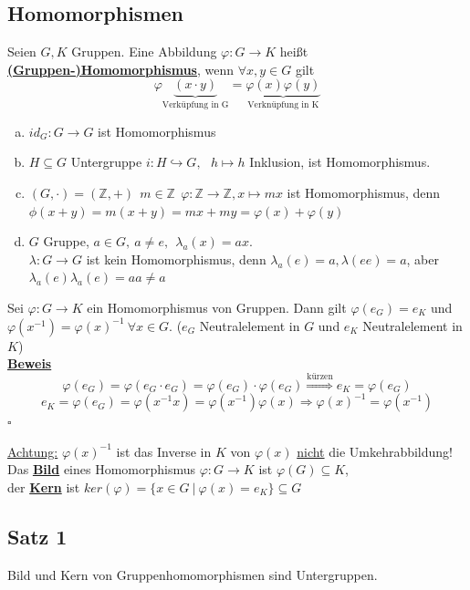 \documentclass[a4paper, pagesize=pdftex, pdftex, twoside, headsepline, index=totoc,toc=listof, fontsize=10pt, cleardoublepage=empty, headinclude, DIV=13, BCOR=13mm]{scrartcl}
\newcommand{\bet}[1]{\uline{\textbf{#1}}} %
\newcommand{\Index}[1]{\uline{\textbf{#1}}\index{#1}} %
\begin{document}
\subsection{Homomorphismen}
\label{sub:homomorphismen}
Seien $G,K$ Gruppen. Eine Abbildung $\varphi: G \to K$ heißt \bet{(Gruppen-)Homomorphismus}, wenn $\forall x,y \in G$ gilt
\[\varphi\underbrace{(x\cdot y)}_{\text{Verküpfung in G} } =\underbrace{\varphi(x)\varphi(y)}_{\text{Verknüpfung in K}} \]

\begin{enumerate}[(a)]
	\item $id_G: G \to G$ ist Homomorphismus
	\item $H \subseteq G$ Untergruppe   $i:H \hookrightarrow G,~~~h \mapsto h$ Inklusion, ist Homomorphismus.
	\item $(G,\cdot)=(\mathds{Z},+)~~m\in \mathds{Z} ~~ \varphi:\mathds{Z} \to \mathds{Z}, x\mapsto mx$ ist Homomorphismus, denn $\phi(x+y)=m(x+y)=mx+my=\varphi(x)+\varphi(y)$
	\item $G$ Gruppe, $a \in G,~ a\not= e,~~ \lambda_a(x)=ax$.\\
	$\lambda: G \to G$ ist kein Homomorphismus, denn $\lambda_a(e)=a, \lambda(ee)=a$, aber $\lambda_a(e)\lambda_a(e)=aa\not=a$
\end{enumerate}

Sei $\varphi:G \to K$ ein Homomorphismus von Gruppen. Dann gilt $\varphi(e_G)=e_K$ und $\varphi(x^{-1})=\varphi(x)^{-1}~\forall x \in G$. ($e_G$ Neutralelement in $G$ und $e_K$ Neutralelement in $K$)\\
\bet{Beweis}\\
\[
	\varphi(e_G)=\varphi(e_G \cdot e_G)=\varphi(e_G) \cdot \varphi(e_G)
	\stackrel{\text{kürzen}}{\Rightarrow} e_K=\varphi(e_G)
\]
\[
	e_K=\varphi(e_G)=\varphi(x^{-1}x)=\varphi(x^{-1})\varphi(x) \Rightarrow \varphi(x)^{-1}=\varphi(x^{-1})
\]
\hfill $\square$

\uline{Achtung:} $\varphi(x)^{-1}$ ist das Inverse in $K$ von $\varphi(x)$ \uline{nicht} die Umkehrabbildung!\\

Das \Index{Bild} eines Homomorphismus $\varphi:G \to K$ ist $\varphi(G)\subseteq K$,\\
der \Index{Kern} ist $ker(\varphi)=\{x \in G~|~\varphi(x)=e_K \}\subseteq G$

\subsection{Satz 1}
\label{sub:satz_1}
Bild und Kern von Gruppenhomomorphismen sind Untergruppen.\\
\end{document}
